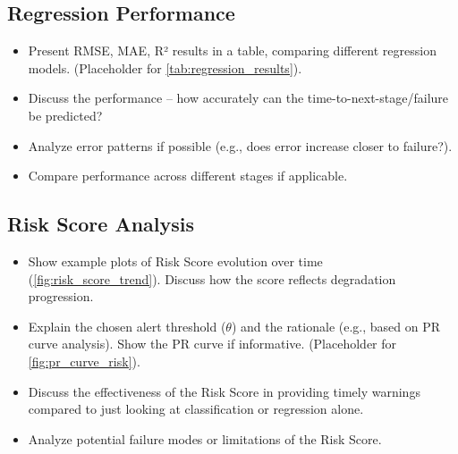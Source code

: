 \subsection{Regression Performance}
\begin{itemize}
	\item Present RMSE, MAE, R² results in a table, comparing different regression models. (Placeholder for \cref{tab:regression_results}).
	\item Discuss the performance – how accurately can the time-to-next-stage/failure be predicted?
	\item Analyze error patterns if possible (e.g., does error increase closer to failure?).
	\item Compare performance across different stages if applicable.
\end{itemize}


\subsection{Risk Score Analysis}
\begin{itemize}
	\item Show example plots of Risk Score evolution over time (\cref{fig:risk_score_trend}). Discuss how the score reflects degradation progression.
	\item Explain the chosen alert threshold ($\theta$) and the rationale (e.g., based on PR curve analysis). Show the PR curve if informative. (Placeholder for \cref{fig:pr_curve_risk}).
	\item Discuss the effectiveness of the Risk Score in providing timely warnings compared to just looking at classification or regression alone.
	\item Analyze potential failure modes or limitations of the Risk Score.
\end{itemize}

